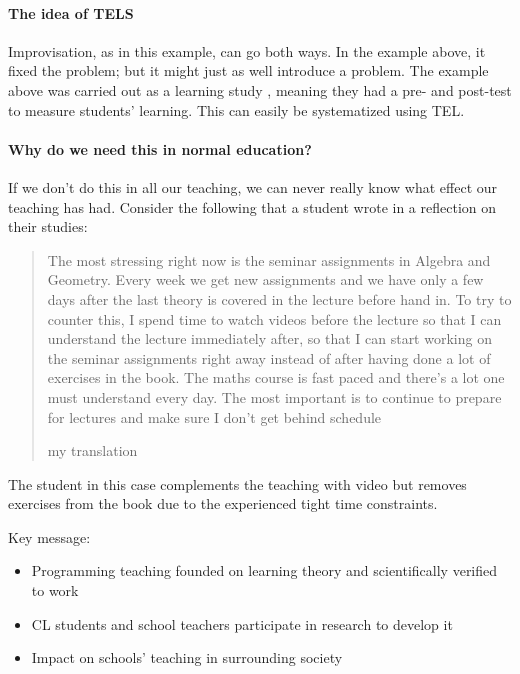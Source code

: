\paragraph{The idea of \acs*{TELS}}

Improvisation, as in this example, can go both ways.
In the example above, it fixed the problem; but it might just as well introduce 
a problem.
The example above was carried out as a learning study 
\parencite{LearningStudy}, meaning they had a pre- and post-test to measure 
students' learning.
This can easily be systematized using \ac{TEL}.

\paragraph{Why do we need this in normal education?}

If we don't do this in all our teaching, we can never really know what effect 
our teaching has had.
Consider the following that a student wrote in a reflection on their studies:
\blockquote[my translation][.]{%
  The most stressing right now is the seminar assignments in  Algebra and Geometry.
  Every week we get new assignments and we have only a few days after the last 
  theory is covered in the lecture before hand in.
  To try to counter this, I spend time to watch videos before the lecture so 
  that I can understand the lecture immediately after, so that I can start 
  working on the seminar assignments right away instead of after having done a 
  lot of exercises in the book.
  The maths course is fast paced and there's a lot one must understand every 
  day.
  The most important is to continue to prepare for lectures and make sure I 
  don't get behind schedule%
}
The student in this case complements the teaching with video but removes 
exercises from the book due to the experienced tight time constraints.

Key message:
\begin{itemize}
  \item Programming teaching founded on learning theory and scientifically 
    verified to work

  \item CL students and school teachers participate in research to develop it

  \item Impact on schools' teaching in surrounding society
\end{itemize}


